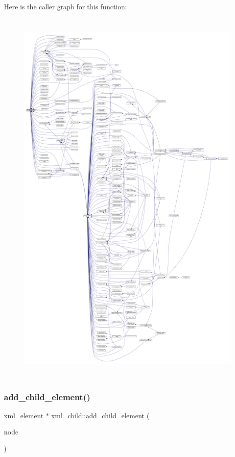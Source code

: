 Here is the caller graph for this function\+:
\nopagebreak
\begin{figure}[H]
\begin{center}
\leavevmode
\includegraphics[height=550pt]{d7/df9/classxml__child_a07932d44513704bb21e12bd693fc917e_icgraph}
\end{center}
\end{figure}
\mbox{\label{classxml__child_ad40725a0ffe13e1618ef1d9c757a9357}} 
\subsubsection{\texorpdfstring{add\+\_\+child\+\_\+element()}{add\_child\_element()}\hspace{0.1cm}{\footnotesize\ttfamily [2/2]}}
{\footnotesize\ttfamily \hyperlink{classxml__element}{xml\+\_\+element} $\ast$ xml\+\_\+child\+::add\+\_\+child\+\_\+element (\begin{DoxyParamCaption}\item[{const xml\+\_\+node\+Ref \&}]{node }\end{DoxyParamCaption})}




